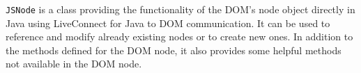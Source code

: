 \texttt{JSNode} is a class providing the functionality of the DOM's node object directly in Java using LiveConnect for Java to DOM communication. It can be used to reference and modify already existing nodes or to create new ones. In addition to the methods defined for the DOM node, it also provides some helpful methods not available in the DOM node.

